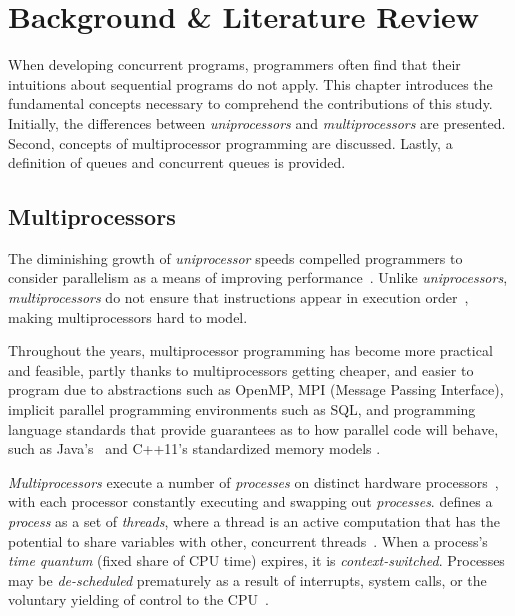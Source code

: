 \chapter{Background \& Literature Review\label{chap:background}} 

When developing concurrent programs, programmers often find that their
intuitions about sequential programs do not apply. This chapter introduces the
fundamental concepts necessary to comprehend the contributions of this study.
Initially, the differences between \emph{uniprocessors} and
\emph{multiprocessors} are presented. Second, concepts of multiprocessor programming
are discussed. Lastly, a definition of queues and concurrent queues is
provided.

\section{Multiprocessors}
The diminishing growth of \emph{uniprocessor} speeds
compelled programmers to consider parallelism as a means of improving
performance~\citep{cantrill2008real}. Unlike \emph{uniprocessors}, \emph{multiprocessors} do
not ensure that instructions appear in execution order~\cite{scott2013shared},
making multiprocessors hard to model.


Throughout the years, multiprocessor programming has become more practical and
feasible, partly thanks to multiprocessors getting cheaper, and
easier to program due to abstractions such as OpenMP, MPI (Message Passing
Interface), implicit parallel programming environments such as SQL, and
programming language standards that provide guarantees as to how parallel code will
behave, such as Java's~\citep{javamemorymodel2014} and C++11's
\citep{cppmemorymodel} standardized memory models
\citep[Chapter~2.2]{perfbook2021}.

\emph{Multiprocessors} execute a number of \emph{processes} on distinct
hardware processors~\citep[Appendix~B.2]{herlihy2020art}, with each processor
constantly executing and swapping out \emph{processes}. \citeauthor{scott2013shared}
defines a \emph{process} as a set of \emph{threads}, where a thread is an
active computation that has the potential to share variables with other,
concurrent threads~\citep[p.6]{scott2013shared}. When a process's \emph{time
quantum} (fixed share of CPU time) expires, it is
\emph{context-switched}. Processes may be \emph{de-scheduled} prematurely as a result
of interrupts, system calls, or the voluntary yielding of control to
the CPU~\citep[Section~3.2.3]{osconcepts2021}.


